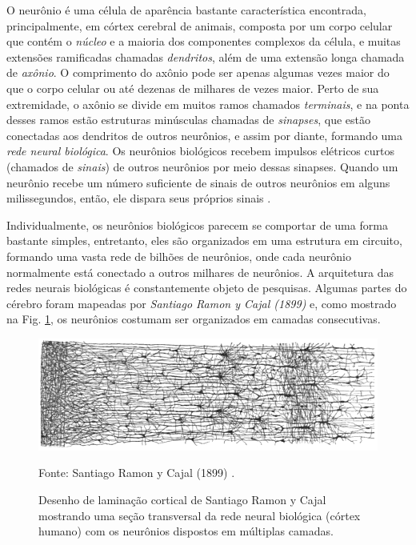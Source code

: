O neurônio é uma célula de aparência bastante característica encontrada, principalmente, em córtex cerebral de animais, composta por um corpo celular que contém o \textit{núcleo} e a maioria dos componentes complexos da célula, e muitas extensões ramificadas chamadas \textit{dendritos}, além de uma extensão longa chamada de \textit{axônio}. O comprimento do axônio pode ser apenas algumas vezes maior do que o corpo celular ou até dezenas de milhares de vezes maior. Perto de sua extremidade, o axônio se divide em muitos ramos chamados \textit{terminais}, e na ponta desses ramos estão estruturas minúsculas chamadas de \textit{sinapses}, que estão conectadas aos dendritos de outros neurônios, e assim por diante, formando uma \textit{rede neural biológica}. Os neurônios biológicos recebem impulsos elétricos curtos (chamados de \textit{sinais}) de outros neurônios por meio dessas sinapses. Quando um neurônio recebe um número suficiente de sinais de outros neurônios em alguns milissegundos, então, ele dispara seus próprios sinais \cite{gerstner2002spiking,dayan2001theoretical}.

Individualmente, os neurônios biológicos parecem se comportar de uma forma bastante simples, entretanto, eles são organizados em uma estrutura em circuito, formando uma vasta rede de bilhões de neurônios, onde cada neurônio normalmente está conectado a outros milhares de neurônios. A arquitetura das redes neurais biológicas é constantemente objeto de pesquisas. Algumas partes do cérebro foram mapeadas por \textit{Santiago Ramon y Cajal (1899)} e, como mostrado na Fig. \ref{fig: Cajal_cortex_drawings}, os neurônios costumam ser organizados em camadas consecutivas.

\begin{figure}[H]
    \centering
    \includegraphics[width=\textwidth]{04-Figuras/Cajal_cortex_drawings.png}
    \caption{Desenho de laminação cortical de Santiago Ramon y Cajal mostrando uma seção transversal da rede neural biológica (córtex humano) com os neurônios dispostos em múltiplas camadas.} \par
    Fonte: Santiago Ramon y Cajal (1899) \cite{y1899comparative}.
    \label{fig: Cajal_cortex_drawings}
\end{figure}


